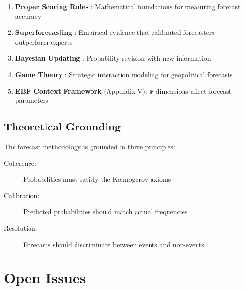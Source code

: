 \begin{enumerate}
    \item \textbf{Proper Scoring Rules} \citep{brier1950verification, good1952rational}: Mathematical foundations for measuring forecast accuracy
    \item \textbf{Superforecasting} \citep{tetlock2015superforecasting}: Empirical evidence that calibrated forecasters outperform experts
    \item \textbf{Bayesian Updating} \citep{bayes1763essay}: Probability revision with new information
    \item \textbf{Game Theory} \citep{selten1965spieltheoretische}: Strategic interaction modeling for geopolitical forecasts
    \item \textbf{EBF Context Framework} (Appendix V): $\Psi$-dimensions affect forecast parameters
\end{enumerate}

\subsection{Theoretical Grounding}

The forecast methodology is grounded in three principles:

\begin{description}
    \item[Coherence:] Probabilities must satisfy the Kolmogorov axioms
    \item[Calibration:] Predicted probabilities should match actual frequencies
    \item[Resolution:] Forecasts should discriminate between events and non-events
\end{description}

\section{Open Issues}
\label{sec:fct-open-issues}

